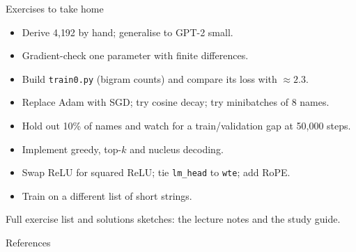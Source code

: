 \documentclass[aspectratio=169,11pt]{beamer}
\begin{document}
\begin{frame}{Exercises to take home}
\begin{itemize}
  \item Derive 4{,}192 by hand; generalise to GPT-2 small.
  \item Gradient-check one parameter with finite differences.
  \item Build \texttt{train0.py} (bigram counts) and compare its loss with $\approx 2.3$.
  \item Replace Adam with SGD; try cosine decay; try minibatches of 8 names.
  \item Hold out 10\% of names and watch for a train/validation gap at 50{,}000 steps.
  \item Implement greedy, top-$k$ and nucleus decoding.
  \item Swap ReLU for squared ReLU; tie \texttt{lm\_head} to \texttt{wte}; add RoPE.
  \item Train on a different list of short strings.
\end{itemize}
Full exercise list and solutions sketches: the lecture notes and the study guide.
\end{frame}

\begin{frame}[allowframebreaks]{References}
\printbibliography[heading=none]
\end{frame}
\end{document}
